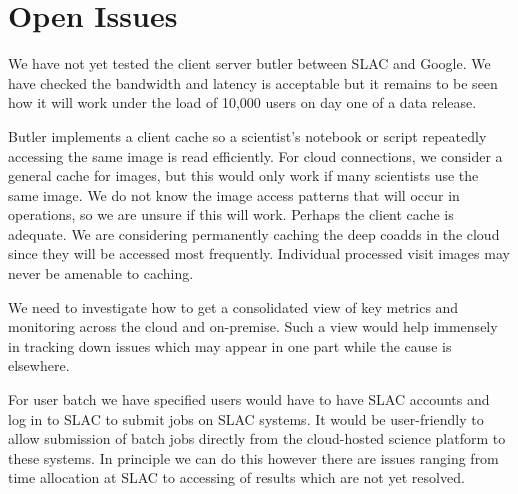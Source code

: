 \section{Open Issues} \label{sec:open}

We have not yet tested the client server butler between SLAC and Google.
We have checked the bandwidth and latency is acceptable but it remains to be seen how it will work under the load of 10,000 users on day one of a data release.

Butler implements a client cache so a scientist's notebook or script repeatedly accessing the same image is read efficiently.
For cloud connections, we consider a general cache for images, but this would only work if many scientists use the same image.
We do not know the image access patterns that will occur in operations, so we are unsure if this will work. Perhaps the client cache is adequate.
We are considering permanently caching the deep coadds in the cloud since they will be accessed most frequently.
Individual processed visit images may never be amenable to caching.

We need to investigate how to get a  consolidated view of key metrics and monitoring across the cloud and on-premise.
Such a view would help immensely in tracking down issues which may appear in one part while the cause is elsewhere.

For user batch we have specified users would have to have SLAC accounts and log in to SLAC to submit jobs \cite{DMTN-223} on SLAC systems.
It would be user-friendly to allow submission of batch jobs directly from the cloud-hosted science platform to these systems.
In principle we can do this however there are issues ranging from time allocation at SLAC to accessing of results which are not yet resolved.
